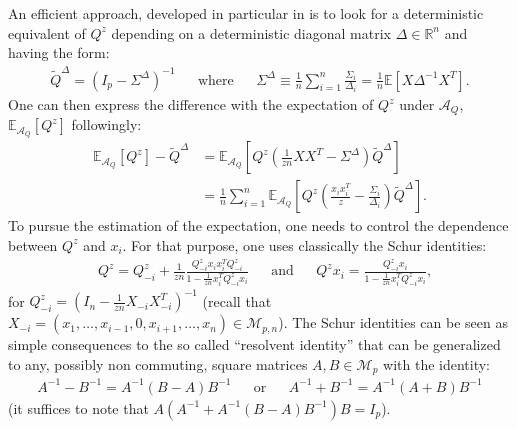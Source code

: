 \documentclass[a4papaer, titlepage]{book}
\begin{document}
An efficient approach, developed in particular in \cite{SIL86,SIL95} is to look for a deterministic equivalent of $Q^z$ depending on a deterministic diagonal matrix $\Delta \in \mathbb R^n$ and having the form:
\begin{align}\label{eq:definition_of_tilde_Q}
  \tilde Q^\Delta= \left( I_p - \Sigma^{\Delta}\right)^{-1}&
  &\text{where}&
  &\Sigma^{\Delta} \equiv  \frac{1}{n}\sum_{i=1}^n \frac{\Sigma_i}{\Delta_i} = \frac{1}{n} \mathbb E[X \Delta^{-1} X^T].
 \end{align}
 One can then express the difference with the expectation of $Q^z$ under $\mathcal A_Q$, $\mathbb{E}_{\mathcal A_Q} \left[Q^z\right]$ followingly:
 \begin{align*}
  \mathbb{E}_{\mathcal A_Q} \left[Q^z\right] - \tilde Q^\Delta
  &=\mathbb{E}_{\mathcal A_Q}\left[Q^z\left(\frac{1}{zn}XX^T - \Sigma^{\Delta}\right)\tilde{Q}^\Delta\right] \\
  &=\frac{1}{n}\sum_{i=1}^n  \mathbb{E}_{\mathcal A_Q}\left[Q^z  \left(\frac{x_ix_i^T}z - \frac{\Sigma_i}{\Delta_i} \right)\tilde{Q}^\Delta\right].
\end{align*}
To pursue the estimation of the expectation, one needs to control the dependence between $Q^z$ and $x_i$. For that purpose, one uses classically the Schur identities:
\begin{align}\label{eq:lien_q_qj_schur}
  &Q^z=Q^z_{-i} +\frac{1}{zn}\frac{Q^z_{-i}x_ix_i^TQ^z_{-i}}{1- \frac1{zn}x_i^TQ_{-i}^zx_i}&
  &\text{and}&
  &Q^zx_i=\frac{Q^z_{-i}x_i}{1- \frac1{zn}x_i^TQ^z_{-i}x_i},
\end{align}
for $Q_{-i}^z = (I_n - \frac{1}{zn} X_{-i}X_{-i}^T)^{-1}$ (recall that $X_{-i} = (x_1,\ldots, x_{i-1}, 0, x_{i+1}, \ldots, x_n) \in \mathcal M_{p,n}$). The Schur identities can be seen as simple consequences to the so called ``resolvent identity'' that can be generalized to any, possibly non commuting, square matrices $A,B \in \mathcal M_p$ with the identity:
\begin{align}\label{eq:resolvent_identity}
   A^{-1} - B^{-1} = A^{-1} (B-A) B^{-1}&
   &\text{or}&
   &A^{-1} + B^{-1} = A^{-1} (A+B) B^{-1}
 \end{align}
 (it suffices to note that $A(A^{-1} + A^{-1} (B-A) B^{-1})B = I_p$).
\end{document}
